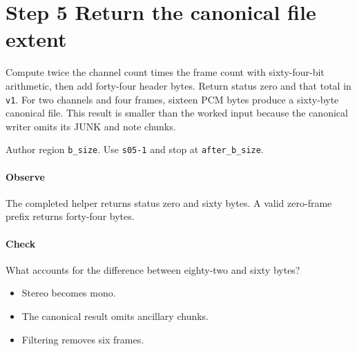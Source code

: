 \section{Step 5 Return the canonical file extent}\label{pcm-wav-s05}
Compute twice the channel count times the frame count with sixty-four-bit arithmetic, then add forty-four header bytes. Return status zero and that total in \texttt{v1}. For two channels and four frames, sixteen PCM bytes produce a sixty-byte canonical file. This result is smaller than the worked input because the canonical writer omits its JUNK and note chunks.

Author region \texttt{b\_size}. Use \texttt{s05-1} and stop at \texttt{after\_b\_size}.

\paragraph{Observe} The completed helper returns status zero and sixty bytes. A valid zero-frame prefix returns forty-four bytes.

\paragraph{Check} What accounts for the difference between eighty-two and sixty bytes?
\begin{itemize}
  \item[A.] Stereo becomes mono.
  \item[B.] The canonical result omits ancillary chunks.
  \item[C.] Filtering removes six frames.
\end{itemize}
